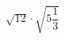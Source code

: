 \begin{ex}[type=calculate]
	\begin{condition}
		\( \sqrt{12}\cdot\sqrt{5\dfrac{1}{3}} \)
	\end{condition}
\end{ex}